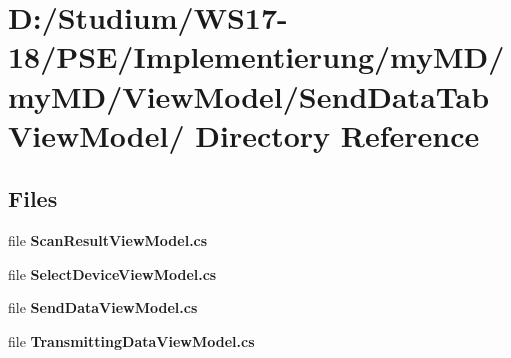 \hypertarget{dir_D_3A_2FStudium_2FWS17_2D18_2FPSE_2FImplementierung_2FmyMD_2FmyMD_2FViewModel_2FSendDataTabViewModel_2F}{
\section{D:/Studium/WS17-18/PSE/Implementierung/my\-MD/my\-MD/View\-Model/Send\-Data\-Tab\-View\-Model/ Directory Reference}
\label{dir_D_3A_2FStudium_2FWS17_2D18_2FPSE_2FImplementierung_2FmyMD_2FmyMD_2FViewModel_2FSendDataTabViewModel_2F}
}


\subsection*{Files}
\begin{CompactItemize}
\item 
file {\bf Scan\-Result\-View\-Model.cs}
\item 
file {\bf Select\-Device\-View\-Model.cs}
\item 
file {\bf Send\-Data\-View\-Model.cs}
\item 
file {\bf Transmitting\-Data\-View\-Model.cs}
\end{CompactItemize}
